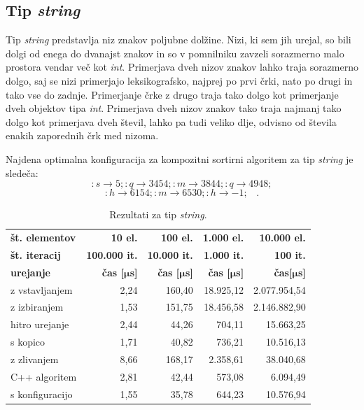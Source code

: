 \documentclass[a4paper,oneside,12pt]{article}
\newcommand{\lra}{\ensuremath{\longrightarrow}}
\newcommand{\edot}{\;\;\;.}
\newcommand{\bmu}{\ensuremath{\boldsymbol{\mu}}}
\newcommand{\usec}{\ensuremath{\bmu}s}
\begin{document}
\subsection{Tip \emph{string}}
\label{chapter:rez:string}
Tip \emph{string} predstavlja niz znakov poljubne dolžine. Nizi, ki sem jih urejal, so
bili dolgi od enega do dvanajst znakov in so v pomnilniku zavzeli sorazmerno malo prostora
vendar več kot \emph{int}. Primerjava dveh nizov znakov lahko traja sorazmerno dolgo, saj se
nizi primerjajo leksikografsko, najprej po prvi črki, nato po drugi in tako vse do zadnje.
Primerjanje črke z drugo traja tako dolgo kot primerjanje dveh objektov tipa \emph{int}.
Primerjava dveh nizov znakov tako traja najmanj tako dolgo kot primerjava dveh števil, lahko
pa tudi veliko dlje, odvisno od števila enakih zaporednih črk med nizoma.

Najdena optimalna konfiguracija za kompozitni sortirni algoritem za tip \emph{string} je sledeča:
\[ :s \lra 5;:q \lra 3454;:m \lra 3844;:q \lra 4948; \] 
\[ :h \lra 6154;:m \lra 6530;:h \lra -1; \edot \]

\begin{table}[h!]
  \centering
  \caption{Rezultati za tip \emph{string}.}
  \label{tab:rez:string} \vspace{1ex}
  \begin{tabular}{l!{\vrule width 1pt}r|r|r|r}
    \bf št. elementov     & \bf 10 el.& \bf 100 el.& \bf 1.000 el. & \bf 10.000 el. \\ 
    \bf št. iteracij      & \bf 100.000 it. & \bf 10.000 it. & \bf 1.000 it. & \bf 100 it. \\ \hline
    \bf urejanje          & \bf čas [\usec] & \bf čas [\usec] & \bf čas [\usec] & \bf čas[\usec] \\  
    z vstavljanjem        & 2,24 & 160,40 & 18.925,12 & 2.077.954,54 \\ \hline
    z izbiranjem          & 1,53 & 151,75 & 18.456,58 & 2.146.882,90 \\ \hline
    hitro urejanje        & 2,44 &  44,26 &    704,11 &    15.663,25 \\ \hline
    s kopico              & 1,71 &  40,82 &    736,21 &    10.516,13 \\ \hline
    z zlivanjem           & 8,66 & 168,17 &  2.358,61 &    38.040,68 \\ \hline
    C++ algoritem         & 2,81 &  42,44 &    573,08 &     6.094,49 \\ \hline
    s konfiguracijo       & 1,55 &  35,78 &    644,23 &    10.576,94 \\ 
  \end{tabular}
\end{table}
\end{document}
